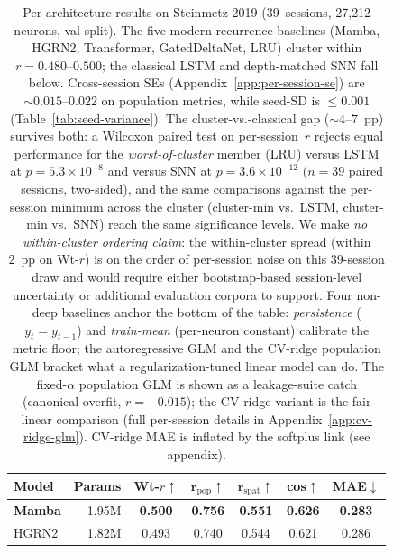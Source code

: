 \documentclass{article}
\begin{document}
\begin{table}[!ht]
  \caption{Per-architecture results on Steinmetz 2019
    (39~sessions, 27{,}212 neurons, val split).
    The five modern-recurrence baselines (Mamba, HGRN2, Transformer,
    GatedDeltaNet, LRU) cluster within $r{=}0.480\text{--}0.500$;
    the classical LSTM and depth-matched SNN fall below.  Cross-session
    SEs (Appendix~\ref{app:per-session-se}) are ${\sim}0.015\text{--}0.022$
    on population metrics, while seed-SD is ${\leq}0.001$
    (Table~\ref{tab:seed-variance}).  The cluster-vs.-classical gap
    (${\sim}4\text{--}7$~pp) survives both: a Wilcoxon paired test on
    per-session~$r$ rejects equal performance for the
    \emph{worst-of-cluster} member (LRU) versus LSTM at
    $p{=}5.3\times10^{-8}$ and versus SNN at $p{=}3.6\times10^{-12}$
    ($n{=}39$ paired sessions, two-sided), and the same comparisons
    against the per-session minimum across the cluster
    (cluster-min vs.\ LSTM, cluster-min vs.\ SNN) reach the same
    significance levels.  We make \emph{no
    within-cluster ordering claim}: the within-cluster spread (within
    2~pp on Wt-$r$) is on the order of per-session noise on this
    39-session draw and would require either bootstrap-based
    session-level uncertainty or additional evaluation corpora to
    support.  Four non-deep baselines anchor the bottom of the table:
    \emph{persistence} ($y_{t}{=}y_{t-1}$) and \emph{train-mean}
    (per-neuron constant) calibrate the metric floor; the
    autoregressive GLM and the CV-ridge population GLM bracket what
    a regularization-tuned linear model can do.  The fixed-$\alpha$
    population GLM is shown as a leakage-suite catch (canonical
    overfit, $r{=}{-}0.015$); the CV-ridge variant is the fair linear
    comparison (full per-session details in
    Appendix~\ref{app:cv-ridge-glm}).  CV-ridge MAE is inflated by
    the softplus link (see appendix).}
  \label{tab:main-results}
  \centering
  \small
  \setlength{\tabcolsep}{4pt}
  \begin{tabular}{@{} l r c c c c c @{}}
    \toprule
    \textbf{Model} & \textbf{Params}
      & \textbf{Wt-$r$$\uparrow$}
      & $\boldsymbol{r_\mathrm{pop}}$$\uparrow$
      & $\boldsymbol{r_\mathrm{spat}}$$\uparrow$
      & \textbf{cos}$\uparrow$
      & \textbf{MAE}$\downarrow$ \\
    \midrule
    \textbf{Mamba}
      & 1.95M & \textbf{0.500} & \textbf{0.756} & \textbf{0.551}
      & \textbf{0.626} & \textbf{0.283} \\
    HGRN2
      & 1.82M & 0.493 & 0.740 & 0.544 & 0.621 & 0.286 \\

\end{tabular}
\end{table}
\end{document}
